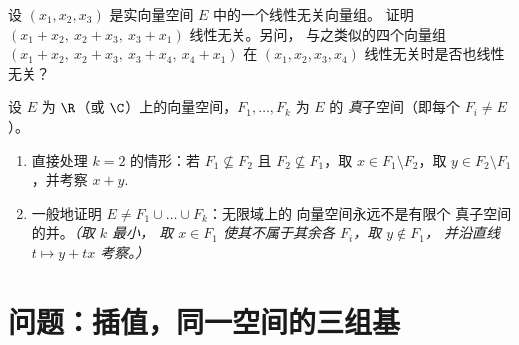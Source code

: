 \begin{exercise}[$\star\star$]\label{exo:b1:vspaces:11}
设 $(x_1, x_2, x_3)$ 是实向量空间 $E$ 中的一个线性无关向量组。
证明 $(x_1 + x_2,\ x_2 + x_3,\ x_3 + x_1)$ 线性无关。另问，
与之类似的四个向量组 $(x_1 + x_2,\ x_2 + x_3,\ x_3 +
x_4,\ x_4 + x_1)$ 在 $(x_1, x_2, x_3, x_4)$ 线性无关时是否也线性无关？
\end{exercise}

\begin{exercise}[$\star\star\star$]\label{exo:b1:vspaces:12}
设 $E$ 为 $\R$（或 $\C$）上的向量空间，$F_1, \dots,
F_k$ 为 $E$ 的 \emph{真}子空间（即每个 $F_i \neq E$）。
\begin{enumerate}
  \item 直接处理 $k = 2$ 的情形：若 $F_1 \not\subseteq
        F_2$ 且 $F_2 \not\subseteq F_1$，取 $x \in F_1
        \setminus F_2$，取 $y \in F_2 \setminus F_1$，并考察 $x
        + y$.
  \item 一般地证明 $E \neq F_1 \cup \dots \cup F_k$：无限域上的
        向量空间永远不是有限个
        真子空间的并。\emph{（取 $k$ 最小，
        取 $x \in F_1$ 使其不属于其余各 $F_i$，取 $y \notin F_1$，
        并沿直线 $t \mapsto y + tx$ 考察。）}
\end{enumerate}
\end{exercise}

\section{问题：插值，同一空间的三组基}

